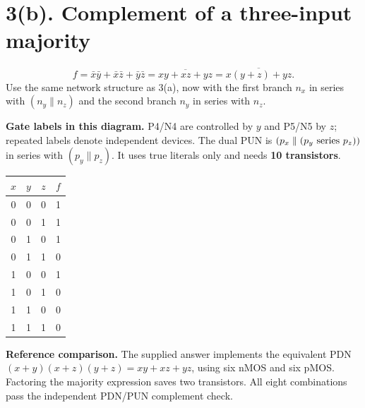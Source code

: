 \documentclass[11pt,a4paper]{article}
\newcommand{\VDD}{V_{\mathrm{DD}}}
\newcommand{\VSS}{V_{\mathrm{SS}}}
\newcommand{\MOS}[5]{
  \coordinate (#1) at (#2,#3);
  \coordinate (#1t) at ($(#1)+(0,.55)$);
  \coordinate (#1b) at ($(#1)+(0,-.55)$);
  \draw (#1t)--($(#1)+(0,.30)$)--($(#1)+(-.18,.30)$);
  \draw ($(#1)+(-.18,.34)$)--($(#1)+(-.18,-.34)$);
  \draw ($(#1)+(-.18,-.30)$)--($(#1)+(0,-.30)$)--(#1b);
  \draw ($(#1)+(-.35,.33)$)--($(#1)+(-.35,-.33)$);
  \def\type{#5}\def\ptype{p}
  \ifx\type\ptype
    \draw ($(#1)+(-.78,0)$)--($(#1)+(-.53,0)$);
    \draw ($(#1)+(-.465,0)$) circle (.065);
    \draw ($(#1)+(-.40,0)$)--($(#1)+(-.35,0)$);
  \else
    \draw ($(#1)+(-.78,0)$)--($(#1)+(-.35,0)$);
  \fi
  \node[anchor=east] at ($(#1)+(-.82,0)$) {$#4$};
  \node[anchor=west,font=\scriptsize] at ($(#1)+(.10,0)$) {#1};
}
\begin{document}
\section*{3(b). Complement of a three-input majority}
\[
 f=\bar x\bar y+\bar x\bar z+\bar y\bar z
   =\overline{xy+xz+yz}
   =\boxed{\overline{x(y+z)+yz}}.
\]
Use the same network structure as 3(a), now with the first branch $n_x$ in series with $(n_y\parallel n_z)$ and the second branch $n_y$ in series with $n_z$.
\begin{center}
\end{center}
\textbf{Gate labels in this diagram.} P4/N4 are controlled by $y$ and P5/N5 by $z$; repeated labels denote independent devices.
The dual PUN is $(p_x\parallel(p_y\hbox{ series }p_z))$ in series with $(p_y\parallel p_z)$. It uses true literals only and needs \textbf{10 transistors}.
\begin{center}\begin{tabular}{ccc|c}\toprule
$x$&$y$&$z$&$f$\\\midrule
0&0&0&1\\0&0&1&1\\0&1&0&1\\0&1&1&0\\
1&0&0&1\\1&0&1&0\\1&1&0&0\\1&1&1&0\\\bottomrule
\end{tabular}\end{center}
\textbf{Reference comparison.} The supplied answer implements the equivalent PDN $(x+y)(x+z)(y+z)=xy+xz+yz$, using six nMOS and six pMOS. Factoring the majority expression saves two transistors. All eight combinations pass the independent PDN/PUN complement check.
\end{document}
